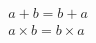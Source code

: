 \documentclass[nofonts]{ctexart}
\begin{document}
\begin{gather}
	a+b=b+a				\\
	a \times b = b \times a
\end{gather}
\end{document}
